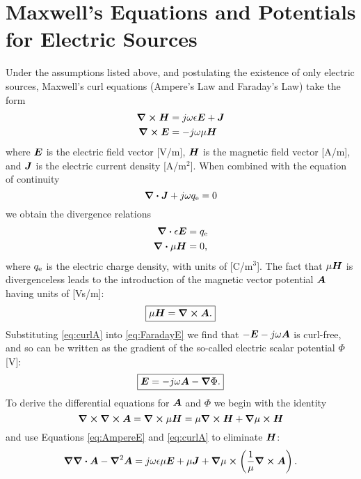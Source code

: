 \section{Maxwell's Equations and Potentials for Electric Sources}
Under the assumptions listed above, and postulating the existence of only
electric sources, Maxwell's curl equations 
(Ampere's Law and Faraday's Law) take the form
\begin{subequations}
  \begin{align}
    \boldsymbol{\nabla} \boldsymbol{\times} \boldsymbol{H} &= j\omega\epsilon \boldsymbol{E} + \boldsymbol{J} \label{eq:AmpereE} \\
    \boldsymbol{\nabla} \boldsymbol{\times} \boldsymbol{E} &= -j\omega\mu \boldsymbol{H}  \label{eq:FaradayE}
  \end{align}
\end{subequations}
where $\boldsymbol{E}$ is the electric field vector [V/m], $\boldsymbol{H}$ is the magnetic field
vector [A/m], and $\boldsymbol{J}$ is the electric current density [A/m$^2$].
When combined with the equation of continuity
\begin{equation}
  \boldsymbol{\nabla} \boldsymbol{\cdot} \boldsymbol{J} + j\omega q_{\text{e}} = 0
\end{equation}
we obtain the divergence relations
\begin{subequations}
  \begin{align}
    \boldsymbol{\nabla} \boldsymbol{\cdot} \epsilon\boldsymbol{E} &= q_{\text{e}}  \label{eq:divE}\\
    \boldsymbol{\nabla} \boldsymbol{\cdot} \mu\boldsymbol{H}       &= 0,
  \end{align}
\end{subequations}
where $q_{\text{e}}$ is the electric charge density,
with units of [C/m$^3$].
The fact that $\mu\boldsymbol{H}$ is divergenceless leads to 
the introduction of the magnetic vector potential $\boldsymbol{A}$
having units of [Vs/m]:
\begin{equation}
  \boxed{
  \mu\boldsymbol{H} = \boldsymbol{\nabla} \boldsymbol{\times} \boldsymbol{A}.  
  } \label{eq:curlA}
\end{equation}
Substituting \eqref{eq:curlA} into \eqref{eq:FaradayE} we find that
$-\boldsymbol{E} - j\omega\boldsymbol{A}$ is curl-free, and so can be written as the gradient
of the so-called electric scalar potential $\Phi$ [V]:
\begin{equation}
  \label{eq:PhiE}
  \boxed{
  \boldsymbol{E} = -j\omega\boldsymbol{A}-\boldsymbol{\nabla}\Phi.
  }
\end{equation}
To derive the differential equations for $\boldsymbol{A}$ and $\Phi$ we
begin with the identity
\begin{equation}
  \boldsymbol{\nabla} \boldsymbol{\times} \boldsymbol{\nabla} \boldsymbol{\times} \boldsymbol{A} = \boldsymbol{\nabla} \boldsymbol{\times} \mu\boldsymbol{H} = \mu \boldsymbol{\nabla} \boldsymbol{\times} \boldsymbol{H} + \boldsymbol{\nabla}\mu \boldsymbol{\times} \boldsymbol{H}
\end{equation}
and use Equations \eqref{eq:AmpereE} and \eqref{eq:curlA} to eliminate
$\boldsymbol{H}$:
\begin{equation}
  \boldsymbol{\nabla}\boldsymbol{\nabla} \boldsymbol{\cdot}\boldsymbol{A} - \boldsymbol{\nabla}^2\boldsymbol{A} =
  j\omega\epsilon\mu\boldsymbol{E} + \mu\boldsymbol{J} + \boldsymbol{\nabla}\mu \boldsymbol{\times} 
  \left(
    \frac{1}{\mu} \boldsymbol{\nabla} \boldsymbol{\times}\boldsymbol{A}
  \right).
\end{equation}
